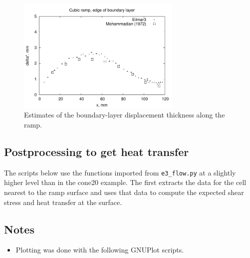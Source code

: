 \begin{figure}[htb]
 \centering
 \includegraphics[width=0.7\textwidth]{../2D/cubic-ramp/delta-star.pdf}
 \caption{Estimates of the boundary-layer displacement thickness along the ramp.}
 \label{fig:cubic-ramp-delta-star}
\end{figure}


\bigskip
\subsection{Postprocessing to get heat transfer}
\label{cubic-ramp-post-processing}
%
The scripts below use the functions imported from \verb!e3_flow.py!
at a slightly higher level than in the cone20 example.
The first extracts the data for the cell nearest to the ramp surface
and uses that data to compute the expected shear stress and heat transfer at the surface.

\noindent
\topbar

\bottombar

\subsection{Notes}
\begin{itemize}
 \item Plotting was done with the following GNUPlot scripts.
 
 
\end{itemize}
